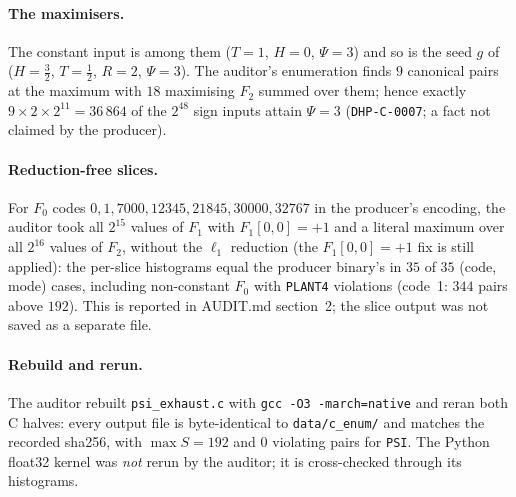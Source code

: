 \documentclass[10pt]{article}
\begin{document}
\paragraph{The maximisers.} The constant input is among them ($T=1$, $H=0$, $\Psi=3$) and so is the seed $g$ of~\cite{dh} ($H=\tfrac32$, $T=\tfrac12$, $R=2$, $\Psi=3$). The auditor's enumeration finds $9$ canonical pairs at the maximum with $18$ maximising $F_2$ summed over them; hence exactly $9\times2\times2^{11}=36\,864$ of the $2^{48}$ sign inputs attain $\Psi=3$ (\texttt{DHP-C-0007}; a fact not claimed by the producer).

\paragraph{Reduction-free slices.} For $F_0$ codes $0,1,7000,12345,21845,30000,32767$ in the producer's encoding, the auditor took all $2^{15}$ values of $F_1$ with $F_1[0,0]=+1$ and a literal maximum over all $2^{16}$ values of $F_2$, without the $\ell_1$ reduction (the $F_1[0,0]=+1$ fix is still applied): the per-slice histograms equal the producer binary's in $35$ of $35$ (code, mode) cases, including non-constant $F_0$ with \texttt{PLANT4} violations (code~1: $344$ pairs above $192$). This is reported in AUDIT.md section~2; the slice output was not saved as a separate file.

\paragraph{Rebuild and rerun.} The auditor rebuilt \texttt{psi\_exhaust.c} with \texttt{gcc -O3 -march=native} and reran both C halves: every output file is byte-identical to \texttt{data/c\_enum/} and matches the recorded sha256, with $\max S=192$ and $0$ violating pairs for \texttt{PSI}. The Python float32 kernel was \emph{not} rerun by the auditor; it is cross-checked through its histograms.
\end{document}
